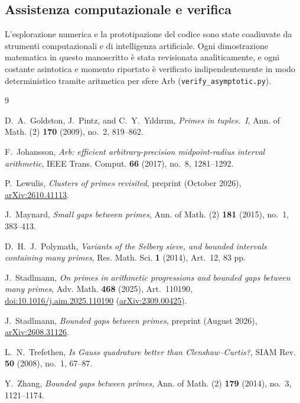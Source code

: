 \documentclass[11pt, reqno]{amsart}
\theoremstyle{remark}
\numberwithin{equation}{section}
\begin{document}
\subsection*{Assistenza computazionale e verifica}
L'esplorazione numerica e la prototipazione del codice sono state coadiuvate da strumenti
computazionali e di intelligenza artificiale. Ogni dimostrazione matematica in questo manoscritto
è stata revisionata analiticamente, e ogni costante asintotica e momento riportato è verificato
indipendentemente in modo deterministico tramite aritmetica per sfere Arb (\texttt{verify\_asymptotic.py}).

\begin{thebibliography}{9}\raggedright

D.~A.~Goldston, J.~Pintz, and C.~Y.~Y{\i}ld{\i}r{\i}m,
\emph{Primes in tuples.~I},
Ann. of Math. (2) \textbf{170} (2009), no.~2, 819--862.

F.~Johansson,
\emph{Arb: efficient arbitrary-precision midpoint-radius interval arithmetic},
IEEE Trans. Comput. \textbf{66} (2017), no.~8, 1281--1292.

P.~Lewulis,
\emph{Clusters of primes revisited},
preprint (October 2026), \href{https://arxiv.org/abs/2610.41113}{arXiv:2610.41113}.

J.~Maynard,
\emph{Small gaps between primes},
Ann. of Math. (2) \textbf{181} (2015), no.~1, 383--413.

D.~H.~J.~Polymath,
\emph{Variants of the Selberg sieve, and bounded intervals containing many primes},
Res. Math. Sci. \textbf{1} (2014), Art.~12, 83 pp.

J.~Stadlmann,
\emph{On primes in arithmetic progressions and bounded gaps between many primes},
Adv. Math. \textbf{468} (2025), Art.~110190, \href{https://doi.org/10.1016/j.aim.2025.110190}{doi:10.1016/j.aim.2025.110190}
(\href{https://arxiv.org/abs/2309.00425}{arXiv:2309.00425}).

J.~Stadlmann,
\emph{Bounded gaps between primes},
preprint (August 2026), \href{https://arxiv.org/abs/2608.31126}{arXiv:2608.31126}.

L.~N.~Trefethen,
\emph{Is Gauss quadrature better than Clenshaw--Curtis?},
SIAM Rev. \textbf{50} (2008), no.~1, 67--87.

Y.~Zhang,
\emph{Bounded gaps between primes},
Ann. of Math. (2) \textbf{179} (2014), no.~3, 1121--1174.

\end{thebibliography}
\end{document}
